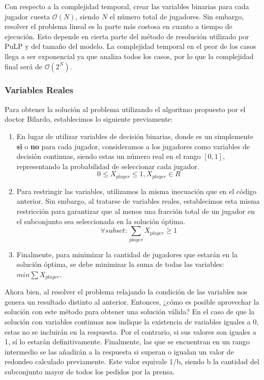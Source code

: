 Con respecto a la complejidad temporal, crear las variables binarias para cada jugador cuesta $\mathcal{O}(N)$, siendo $N$ el número total de jugadores. Sin embargo, resolver el problema lineal es la parte más costosa en cuanto a tiempo de ejecución. Esto depende en cierta parte del método de resolución utilizado por PuLP y del tamaño del modelo. La complejidad temporal en el peor de los casos llega a ser exponencial ya que analiza todos los casos, por lo que la complejidad final será de $\mathcal{O}(2^N)$.

\subsubsection{Variables Reales}

Para obtener la solución al problema utilizando el algoritmo propuesto por el doctor Bilardo, establecimos lo siguiente previamente:
\begin{enumerate}
    \item En lugar de utilizar variables de decisión binarias, donde es un simplemente \textbf{si} o \textbf{no} para cada jugador, consideramos a los jugadores como variables de decisión continuas, siendo estas un número real en el rango $[0, 1]$, representando la probabilidad de seleccionar cada jugador.
    \[ 0 \leq X_{player} \leq 1, X_{player} \in R \]
    \item Para restringir las variables, utilizamos la misma inecuación que en el código anterior. Sin embargo, al tratarse de variables reales, establecimos esta misma restricción para garantizar que al menos una fracción total de un jugador en el subconjunto sea seleccionada en la solución óptima.
    \[ \forall subset: \sum\limits_{player} X_{player} \geq 1 \]
    \item Finalmente, para minimizar la cantidad de jugadores que estarán en la solución óptima, se debe minimizar la suma de todas las variables: $min \sum X_{player}$.
\end{enumerate}

Ahora bien, al resolver el problema relajando la condición de las variables nos genera un resultado distinto al anterior. Entonces, ¿cómo es posible aprovechar la solución con este método para obtener una solución válida? En el caso de que la solución con variables continuas nos indique la existencia de variables iguales a 0, estas no se incluirán en la respuesta. Por el contrario, si sus valores son iguales a 1, sí lo estarán definitivamente. Finalmente, las que se encuentran en un rango intermedio se las añadirán a la respuesta si superan o igualan un valor de redondeo calculado previamente. Este valor equivale 1/b, siendo b la cantidad del subconjunto mayor de todos los pedidos por la prensa.

